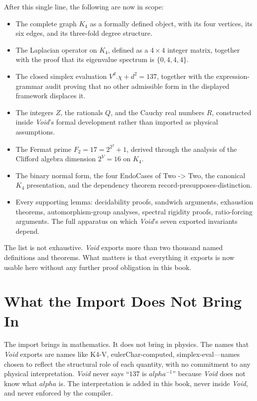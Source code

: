 \documentclass[11pt,a4paper]{book}
\def\alpha{alpha}%
\def\cdot{.}%
\def\mathbb#1{#1}%
\def\texttt#1{#1}%
\begin{document}
After this single line, the following are now in scope:

\begin{itemize}
\item The complete graph $K_4$ as a formally defined object, with its four vertices, its six edges, and its three-fold degree structure.
\item The Laplacian operator on $K_4$, defined as a $4 \times 4$ integer matrix, together with the proof that its eigenvalue spectrum is $\{0, 4, 4, 4\}$.
\item The closed simplex evaluation $V^d \cdot \chi + d^2 = 137$, together with the expression-grammar audit proving that no other admissible form in the displayed framework displaces it.
\item The integers $\mathbb{Z}$, the rationals $\mathbb{Q}$, and the Cauchy real numbers $\mathbb{R}$, constructed inside \textit{Void}'s formal development rather than imported as physical assumptions.
\item The Fermat prime $F_2 = 17 = 2^{2^2} + 1$, derived through the analysis of the Clifford algebra dimension $2^V = 16$ on $K_4$.
\item The binary normal form, the four \texttt{EndoCase}s of \texttt{Two -> Two}, the canonical $K_4$ presentation, and the dependency theorem \texttt{record-presupposes-distinction}.
\item Every supporting lemma: decidability proofs, sandwich arguments, exhaustion theorems, automorphism-group analyses, spectral rigidity proofs, ratio-forcing arguments. The full apparatus on which \textit{Void}'s seven exported invariants depend.
\end{itemize}

The list is not exhaustive. \textit{Void} exports more than two thousand named definitions and theorems. What matters is that everything it exports is now usable here without any further proof obligation in this book.

\section*{What the Import Does Not Bring In}

The import brings in mathematics. It does not bring in physics. The names that \textit{Void} exports are names like \texttt{K4-V}, \texttt{eulerChar-computed}, \texttt{simplex-eval}---names chosen to reflect the structural role of each quantity, with no commitment to any physical interpretation. \textit{Void} never says ``$137$ is $\alpha^{-1}$'' because \textit{Void} does not know what $\alpha$ is. The interpretation is added in this book, never inside \textit{Void}, and never enforced by the compiler.
\end{document}
